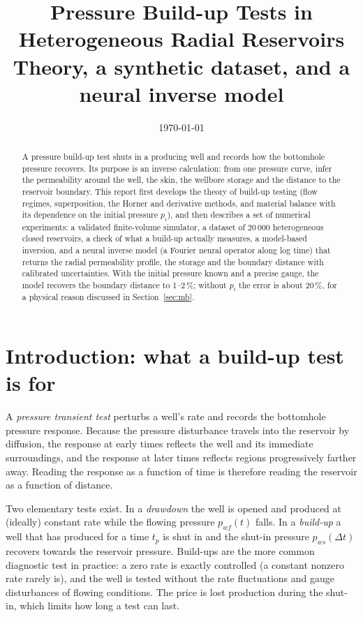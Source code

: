 \documentclass[11pt]{article}
\title{Pressure Build-up Tests in Heterogeneous Radial Reservoirs\\
\large Theory, a synthetic dataset, and a neural inverse model}
\date{\today}
\begin{document}
\maketitle

\begin{abstract}
A pressure build-up test shuts in a producing well and records how the bottomhole pressure recovers. Its purpose is
an inverse calculation: from one pressure curve, infer the permeability around the well, the skin, the wellbore
storage and the distance to the reservoir boundary. This report first develops the theory of build-up testing
(flow regimes, superposition, the Horner and derivative methods, and material balance with its dependence on the
initial pressure $p_i$), and then describes a set of numerical experiments: a validated finite-volume simulator,
a dataset of 20\,000 heterogeneous closed reservoirs, a check of what a build-up actually measures, a model-based
inversion, and a neural inverse model (a Fourier neural operator along log time) that returns the radial
permeability profile, the storage and the boundary distance with calibrated uncertainties. With the initial
pressure known and a precise gauge, the model recovers the boundary distance to 1--2\,\%; without $p_i$ the error
is about 20\,\%, for a physical reason discussed in Section~\ref{sec:mb}.
\end{abstract}

\tableofcontents

\section{Introduction: what a build-up test is for}

A \emph{pressure transient test} perturbs a well's rate and records the bottomhole pressure response. Because the
pressure disturbance travels into the reservoir by diffusion, the response at early times reflects the well and
its immediate surroundings, and the response at later times reflects regions progressively farther away. Reading
the response as a function of time is therefore reading the reservoir as a function of distance.

Two elementary tests exist. In a \emph{drawdown} the well is opened and produced at (ideally) constant rate while
the flowing pressure $p_{wf}(t)$ falls. In a \emph{build-up} a well that has produced for a time $t_p$ is shut in
and the shut-in pressure $p_{ws}(\Delta t)$ recovers towards the reservoir pressure. Build-ups are the more common
diagnostic test in practice: a zero rate is exactly controlled (a constant nonzero rate rarely is), and the well is
tested without the rate fluctuations and gauge disturbances of flowing conditions. The price is lost production
during the shut-in, which limits how long a test can last.
\end{document}
